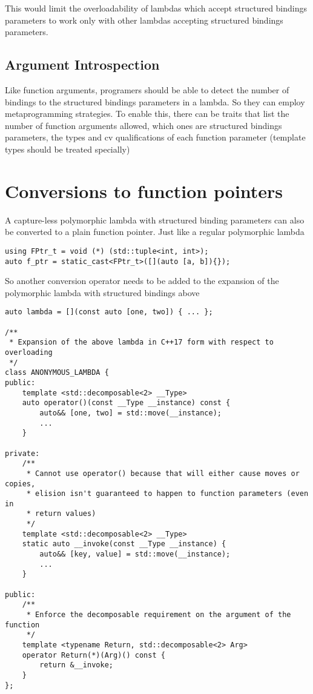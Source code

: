 \documentclass{article}
\begin{document}
This would limit the overloadability of lambdas which accept structured
bindings parameters to work only with other lambdas accepting structured
bindings parameters.

\subsection{Argument Introspection}
Like function arguments, programers should be able to detect the number of
bindings to the structured bindings parameters in a lambda.  So they can
employ metaprogramming strategies.  To enable this, there can be traits that
list the number of function arguments allowed, which ones are structured
bindings parameters, the types and cv qualifications of each function
parameter (template types should be treated specially)


\section{Conversions to function pointers}
A capture-less polymorphic lambda with structured binding parameters can also
be converted to a plain function pointer.  Just like a regular polymorphic
lambda

\begin{lstlisting}
using FPtr_t = void (*) (std::tuple<int, int>);
auto f_ptr = static_cast<FPtr_t>([](auto [a, b]){});
\end{lstlisting}

So another conversion operator needs to be added to the expansion of the
polymorphic lambda with structured bindings above

\begin{lstlisting}
auto lambda = [](const auto [one, two]) { ... };

/**
 * Expansion of the above lambda in C++17 form with respect to overloading
 */
class ANONYMOUS_LAMBDA {
public:
    template <std::decomposable<2> __Type>
    auto operator()(const __Type __instance) const {
        auto&& [one, two] = std::move(__instance);
        ...
    }

private:
    /**
     * Cannot use operator() because that will either cause moves or copies,
     * elision isn't guaranteed to happen to function parameters (even in
     * return values)
     */
    template <std::decomposable<2> __Type>
    static auto __invoke(const __Type __instance) {
        auto&& [key, value] = std::move(__instance);
        ...
    }

public:
    /**
     * Enforce the decomposable requirement on the argument of the function
     */
    template <typename Return, std::decomposable<2> Arg>
    operator Return(*)(Arg)() const {
        return &__invoke;
    }
};
\end{lstlisting}
\end{document}
